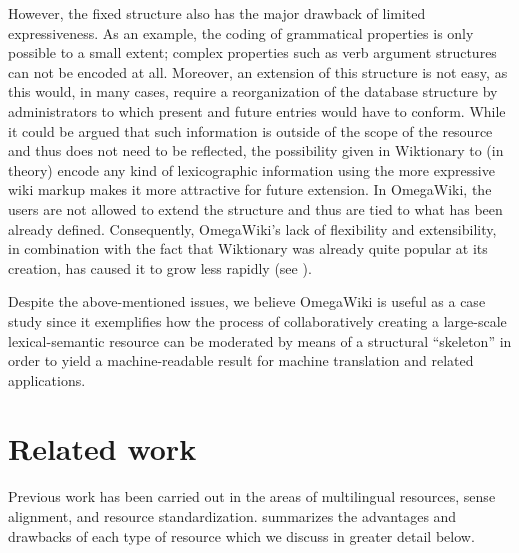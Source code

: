 \documentclass[output=paper]{LSP/langsci}
\begin{document}
However, the fixed structure also has the major drawback of limited expressiveness. As an example, the coding of grammatical properties is only possible to a small extent; complex properties such as verb argument structures can not be encoded at all. Moreover, an extension of this structure is not easy, as this would, in many cases, require a reorganization of the database structure by administrators to which present and future entries would have to conform. While it could be argued that such information is outside of the scope of the resource and thus does not need to be reflected, the possibility given in Wiktionary to (in theory) encode any kind of lexicographic information using the more expressive wiki markup makes it more attractive for future extension. In OmegaWiki, the users are not allowed to extend the structure and thus are tied to what has been already defined. Consequently, OmegaWiki's lack of flexibility and extensibility, in combination with the fact that Wiktionary was already quite popular at its  
creation, has caused it to grow less rapidly (see ). 

Despite the above-mentioned issues, we believe OmegaWiki is useful as a case study since it exemplifies how the process of collaboratively creating a large-scale lexical-semantic resource can be moderated by means of a structural ``skeleton'' in order to yield a machine-readable result for machine translation and related applications.

\section{Related work}
\label{sec:matuschek:background}

Previous work has been carried out in the areas of multilingual resources, sense alignment, and resource standardization.  summarizes the advantages and drawbacks of each type of resource which we discuss in greater detail below.

\begin{table}
  \caption{Comparison of the advantages of different resource types (\textsc{oie} = Open Information Extraction)}
  \label{tab:background:resources}
\end{table}
 
\end{document}
